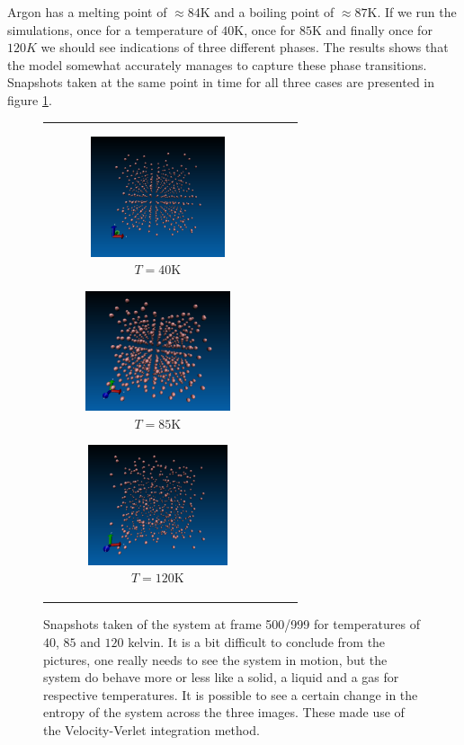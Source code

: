 \documentclass[a4paper]{article}
\begin{document}
    Argon has a melting point of $\approx 84$K and a boiling point of $\approx
    87$K. If we run the simulations, once for a temperature of $40$K, once for
    $85$K and finally once for $120K$ we should see indications of three
    different phases. The results shows that the model somewhat accurately
    manages to capture these phase transitions. Snapshots taken at the same
    point in time for all three cases are presented in figure
    \ref{fig:potential_iteration}.
    \begin{figure}
        \begin{tabular}[c]{ccc}
            \begin{subfigure}[c]{0.32\textwidth}
                \includegraphics[height=100pt, width=\linewidth]{solid_40K.png}
                \caption{$T = 40$K}
            \end{subfigure}
            \begin{subfigure}[c]{0.32\textwidth}
                \includegraphics[height=100pt, width=\linewidth]{liquid_85K.png}
                \caption{$T = 85$K}
            \end{subfigure}
            \begin{subfigure}[c]{0.32\textwidth}
                \includegraphics[height=100pt, width=\linewidth]{gas_120K.png}
                \caption{$T = 120$K}
            \end{subfigure}
        \end{tabular}
        \caption[Argon phases]{Snapshots taken of the system at frame 500/999 for
            temperatures of $40$, $85$ and $120$ kelvin. It is a bit difficult
            to conclude from the pictures, one really needs to see the system
            in motion, but the system do behave more or less like a solid, a
            liquid and a gas for respective temperatures. It is possible to see a
            certain change in the entropy of the system across the three
            images. These made use of the Velocity-Verlet integration method.}
        \label{fig:potential_iteration}
    \end{figure}
\end{document}
